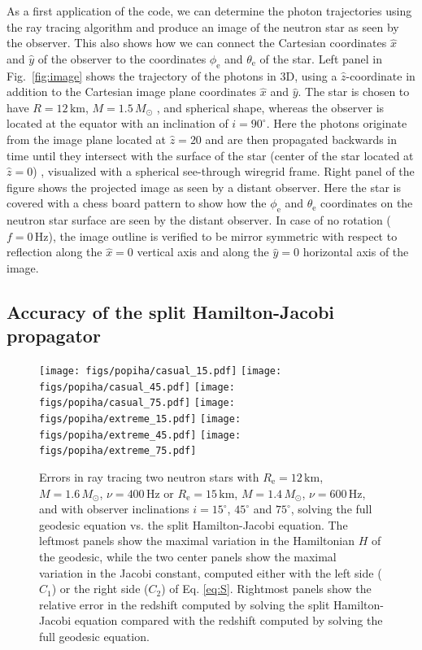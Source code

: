 \documentclass{aa}
\newcommand{\refe}[1]{#1}
\newcommand{\Msun}{\ensuremath{M_{\odot}}}
\begin{document}
As a first application of the code, we can determine the photon trajectories using the ray tracing algorithm and produce an image of the neutron star as seen by the observer.
This also shows how we can connect the Cartesian coordinates $\hat{x}$ and $\hat{y}$ of the observer to the coordinates $\phi_{\mathrm{e}}$ and $\theta_{\mathrm{e}}$ of the star.
Left panel in Fig.~\ref{fig:image} shows the trajectory of the photons in 3D, using a $\hat{z}$-coordinate in addition to the Cartesian image plane coordinates $\hat{x}$ and $\hat{y}$.
The star is chosen to have $R=12\,\mathrm{km}$, $M=1.5\,\Msun$ \refe{, and spherical shape}, whereas the observer is located at the equator with an inclination of $i = 90^{\circ}$.
Here the photons originate from the image plane located at $\hat{z} = 20$ and are then propagated backwards in time until they intersect with the surface of the star (center of the star located at $\hat{z} = 0$) , visualized with a spherical see-through wiregrid frame.
Right panel of the figure shows the projected image as seen by a distant observer.
Here the star is covered with a chess board pattern to show how the $\phi_{\mathrm{e}}$ and $\theta_{\mathrm{e}}$ coordinates on the neutron star surface are seen by the distant observer.
\refe{In case of no rotation ($f = 0\,\mathrm{Hz}$), the image outline is verified to be mirror symmetric with respect to reflection along the $\hat{x} = 0$ vertical axis and along the $\hat{y} = 0$ horizontal axis of the image.}


\subsection{Accuracy of the split Hamilton-Jacobi propagator}

\begin{figure}[htbp!]
\centering
\texttt{[image: figs/popiha/casual\_15.pdf]}
\texttt{[image: figs/popiha/casual\_45.pdf]}
\texttt{[image: figs/popiha/casual\_75.pdf]}
\texttt{[image: figs/popiha/extreme\_15.pdf]}
\texttt{[image: figs/popiha/extreme\_45.pdf]}
\texttt{[image: figs/popiha/extreme\_75.pdf]}
\caption{\label{fig:H_C1_C2}
    Errors in ray tracing two neutron stars with $R_{\mathrm{e}}=12\,\mathrm{km}$, $M=1.6\,\Msun$, $\nu=400\,\mathrm{Hz}$ or $R_{\mathrm{e}}=15\,\mathrm{km}$, $M=1.4\,\Msun$, $\nu=600\,\mathrm{Hz}$, and with observer inclinations $i=15^\circ$, $45^\circ$ and $75^\circ$, solving the full geodesic equation vs. the split Hamilton-Jacobi equation.
    The leftmost panels show the maximal variation in the Hamiltonian $H$ of the geodesic, while the two center panels show the maximal variation in the Jacobi constant, computed either with the left side ($C_1$) or the right side ($C_2$) of Eq. \eqref{eq:S}.
    Rightmost panels show the \refe{relative error in the redshift computed by solving the split Hamilton-Jacobi equation compared with the redshift computed by solving the full geodesic equation.}
}
\end{figure}
\end{document}
